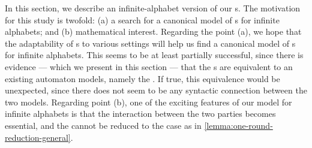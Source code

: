 In this section, we describe an infinite-alphabet version of our s.
The motivation for this study is twofold: (a) a search for a canonical model of s for infinite alphabets; and (b) mathematical interest. Regarding the point (a), we hope that the adaptability of s to various settings will help us  find a canonical model of s for infinite alphabets. This seems to be at least partially successful, since there is evidence --- which we present in this section --- that the s are equivalent to an existing automaton models, namely the . If true, this equivalence would be unexpected, since there does not seem to be any syntactic connection between the two models. Regarding point (b), one of the exciting features of our  model for infinite alphabets is that the interaction between the two parties becomes essential, and the  cannot be reduced to the  case as in \cref{lemma:one-round-reduction-general}.

